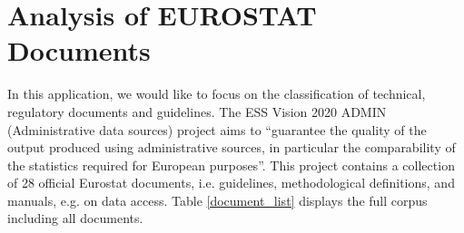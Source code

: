 \documentclass[11pt,a4paper]{article}
\begin{document}
\section{Analysis of EUROSTAT Documents}\label{sec:example2}

In this application, we would like to focus on the classification of technical, regulatory documents and guidelines. The ESS Vision 2020 ADMIN (Administrative data sources) project aims to “guarantee the quality of the output produced using administrative sources, in particular the comparability of the statistics required for European purposes”\cite{ESSVision2020}. This project contains a collection of 28 official Eurostat documents, i.e. guidelines, methodological definitions, and manuals, e.g. on data access. Table \ref{document_list} displays the full corpus including all documents.\\
\end{document}
